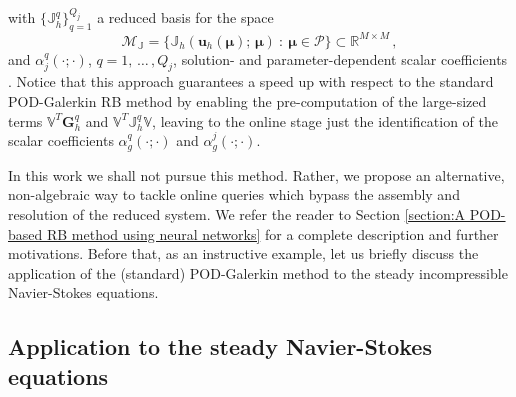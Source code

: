 \documentclass[12pt, a4paper, twoside, openright, notitlepage]{report}
\numberwithin{equation}{chapter}
\theoremstyle{theorem}
\theoremstyle{definition}
\theoremstyle{remark}
\theoremstyle{proposition}
\numberwithin{figure}{chapter}
\newcommand{\bg}[1]{\boldsymbol{#1}}
\begin{document}
		with $\big\lbrace \mathbb{J}_h^q \big\rbrace_{q = 1}^{Q_j}$ a reduced basis for the space
		\begin{equation*}
			\mathcal{M}_{\mathbb{J}} = \big\lbrace \mathbb{J}_h(\mathbf{u}_h(\bg{\mu}); \, \bg{\mu}) ~ : ~ \bg{\mu} \in \mathcal{P} \big\rbrace \subset \mathbb{R}^{M \times M} \, ,
		\end{equation*}
		and $\alpha_j^q(\cdot; \cdot)$, $q = 1, \, \ldots \, , Q_j$, solution- and parameter-dependent scalar coefficients \cite{QMN15}. Notice that this approach guarantees a speed up with respect to the standard POD-Galerkin RB method by enabling the pre-computation of the large-sized terms $\mathbb{V}^T \mathbf{G}_h^q$ and $\mathbb{V}^T \mathbb{J}_h^q \mathbb{V}$, leaving to the online stage just the identification of the scalar coefficients $\alpha_g^q(\cdot; \cdot)$ and $\alpha_g^j(\cdot; \cdot)$. 
		
		In this work we shall not pursue this method. Rather, we propose an alternative, non-algebraic way to tackle online queries which bypass the assembly and resolution of the reduced system. We refer the reader to Section \ref{section:A POD-based RB method using neural networks} for a complete description and further motivations. Before that, as an instructive example, let us briefly discuss the application of the (standard) POD-Galerkin method to the steady incompressible Navier-Stokes equations.
		
	\vspace*{0.3cm}
		
	\subsection{Application to the steady Navier-Stokes equations}
	\label{section:Application to the steady Navier-Stokes equations}
	
\end{document}
